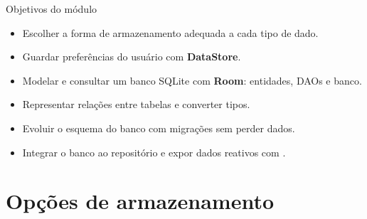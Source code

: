 \documentclass[aspectratio=169,10pt]{beamer}
\begin{document}
\capa

\begin{frame}{Objetivos do módulo}
  \begin{conceito}
    \begin{itemize}
      \item Escolher a forma de armazenamento adequada a cada tipo de dado.
      \item Guardar preferências do usuário com \textbf{DataStore}.
      \item Modelar e consultar um banco SQLite com \textbf{Room}: entidades, DAOs e banco.
      \item Representar relações entre tabelas e converter tipos.
      \item Evoluir o esquema do banco com migrações sem perder dados.
      \item Integrar o banco ao repositório e expor dados reativos com .
    \end{itemize}
  \end{conceito}
\end{frame}

\sumario

\section{Opções de armazenamento}
\end{document}
